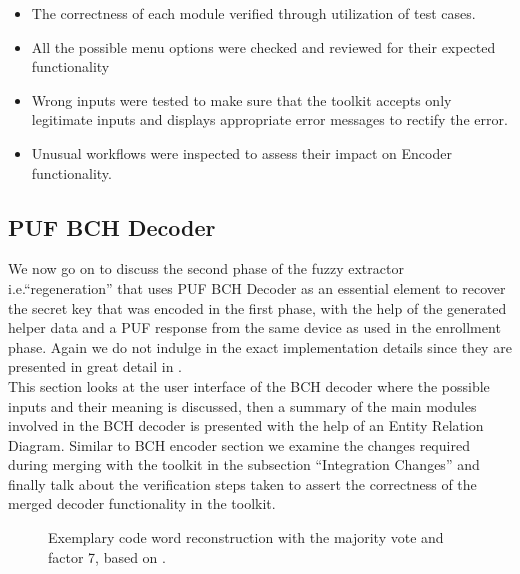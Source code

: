 	\begin{itemize}
		\item The correctness of each module verified through utilization of test cases.
		\item All the possible menu options were checked and reviewed for their expected functionality
		\item Wrong inputs were tested to make sure that the toolkit accepts only legitimate inputs and displays appropriate error messages to rectify the error.
		\item Unusual workflows were inspected to assess their impact on Encoder functionality.
	\end{itemize}

	\subsection{PUF BCH Decoder}
	We now go on to discuss the second phase of the fuzzy extractor i.e.``regeneration'' that uses PUF BCH Decoder as an essential element to recover the secret key that was encoded in the first phase, with the help of the generated helper data and a PUF response from the same device as used in the enrollment phase. Again we do not indulge in the exact implementation details since they are presented in great detail in \cite{71}.\\

	This section looks at the user interface of the BCH decoder where the possible inputs and their meaning is discussed, then a summary of the main modules involved in the BCH decoder
	is presented with the help of an Entity Relation Diagram. Similar to BCH encoder section we examine the changes required during merging with the toolkit in the subsection ``Integration Changes'' and finally talk about the verification steps taken to assert the correctness of the merged decoder functionality in the toolkit.\\

\begin{figure}[h!]
\centering
{}
\caption{Exemplary code word reconstruction with the majority vote and factor 7, based on \cite{10}.}
\label{img:4_MV_codewords}
\end{figure}


